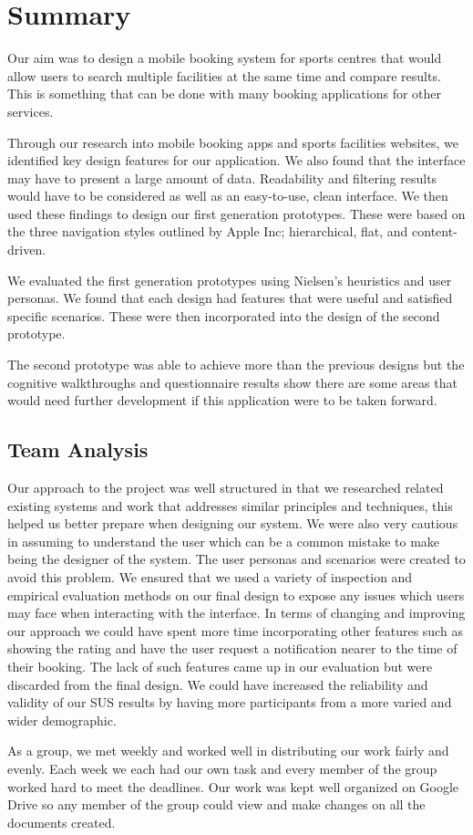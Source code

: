 \section{Summary}
\label{sec:summary}

Our aim was to design a mobile booking system for sports centres that would
allow users to search multiple facilities at the same time and compare results.
This is something that can be done with many booking applications for other
services.

Through our research into mobile booking apps and sports facilities websites,
we identified key design features for our application. We also found that the
interface may have to present a large amount of data. Readability and filtering
results would have to be considered as well as an easy-to-use, clean interface.
We then used these findings to design our first generation prototypes. These
were based on the three navigation styles outlined by Apple Inc; hierarchical,
flat, and content-driven.

We evaluated the first generation prototypes using Nielsen’s heuristics and
user personas. We found that each design had features that were useful and
satisfied specific scenarios. These were then incorporated into the design of
the second prototype.

The second prototype was able to achieve more than the previous designs but the
cognitive walkthroughs and questionnaire results show there are some areas that
would need further development if this application were to be taken forward.

\subsection{Team Analysis}
\label{sub:team_analysis}

Our approach to the project was well structured in that we researched related
existing systems and work that addresses similar principles and techniques,
this helped us better prepare when designing our system. We were also very
cautious in assuming to understand the user which can be a common mistake to
make being the designer of the system. The user personas and scenarios were
created to avoid this problem. We ensured that we used a variety of inspection
and empirical evaluation methods on our final design to expose any issues which
users may face when interacting with the interface.  In terms of changing and
improving our approach we could have spent more time incorporating other
features such as showing the rating and have the user request a notification
nearer to the time of their booking. The lack of such features came up in our
evaluation but were discarded from the final design. We could have increased
the reliability and validity of our SUS results by having more participants
from a more varied and wider demographic.

As a group, we met weekly and worked well in distributing our work fairly and
evenly. Each week we each had our own task and every member of the group worked
hard to meet the deadlines. Our work was kept well organized on Google Drive so
any member of the group could view and make changes on all the documents
created.
